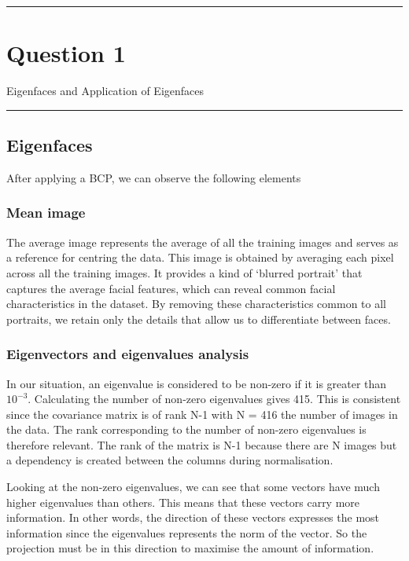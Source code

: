 \rule{\textwidth}{1mm}
\vspace{-2em}
\section{Question 1} Eigenfaces and Application of Eigenfaces
\newline
\rule{\textwidth}{1mm}

\subsection{Eigenfaces}
After applying a BCP, we can observe the following elements
\subsubsection{Mean image}

The average image represents the average of all the training images and serves as a reference for centring the data. This image is obtained by averaging each pixel across all the training images. It provides a kind of ‘blurred portrait’ that captures the average facial features, which can reveal common facial characteristics in the dataset. By removing these characteristics common to all portraits, we retain only the details that allow us to differentiate between faces.

\subsubsection{Eigenvectors and eigenvalues analysis}

In our situation, an eigenvalue is considered to be non-zero if it is greater than $10^{-3}$. Calculating the number of non-zero eigenvalues gives 415. This is consistent since the covariance matrix is of rank N-1 with N = 416 the number of images in the data. The rank corresponding to the number of non-zero eigenvalues is therefore relevant. The rank of the matrix is N-1 because there are N images but a dependency is created between the columns during normalisation.
\newline

Looking at the non-zero eigenvalues, we can see that some vectors have much higher eigenvalues than others. This means that these vectors carry more information. In other words, the direction of these vectors expresses the most information since the eigenvalues represents the norm of the vector. So the projection must be in this direction to maximise the amount of information.
\newline

